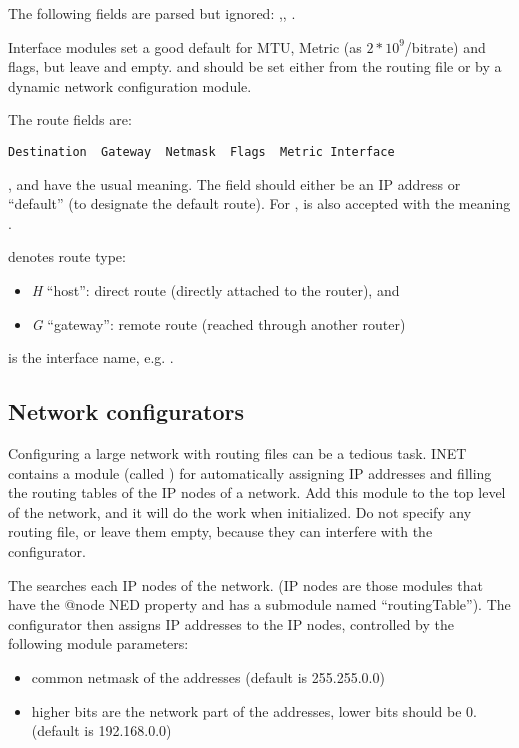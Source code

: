The following fields are parsed but ignored: ,,
.

Interface modules set a good default for MTU, Metric (as $2*10^9$/bitrate) and
flags, but leave  and  empty.  and
 should be set either from the routing file or by a dynamic network
configuration module.

The route fields are:

\begin{verbatim}
Destination  Gateway  Netmask  Flags  Metric Interface
\end{verbatim}

,  and  have the usual meaning.
The  field should either be an IP address or ``default''
(to designate the default route). For , \ttt{*} is also
accepted with the meaning .

 denotes route type:

\begin{itemize}
  \item \textit{H} ``host'': direct route (directly attached to the router), and
  \item \textit{G} ``gateway'': remote route (reached through another router)
\end{itemize}

 is the interface name, e.g. .


\subsection{Network configurators}

Configuring a large network with routing files can be a tedious task.
INET contains a module (called )
for automatically assigning IP addresses and filling the routing tables
of the IP nodes of a network. Add this module to the top level
of the network, and it will do the work when initialized. Do not
specify any routing file, or leave them empty, because they can
interfere with the configurator.

The  searches each IP nodes of the network.
(IP nodes are those modules that have the @node NED property and
has a  submodule named ``routingTable'').
The configurator then assigns IP addresses to the IP nodes, controlled
by the following module parameters:
\begin{itemize}
  \item {} common netmask of the addresses (default is 255.255.0.0)
  \item {} higher bits are the network part of the addresses,
        lower bits should be 0. (default is 192.168.0.0)
\end{itemize}

